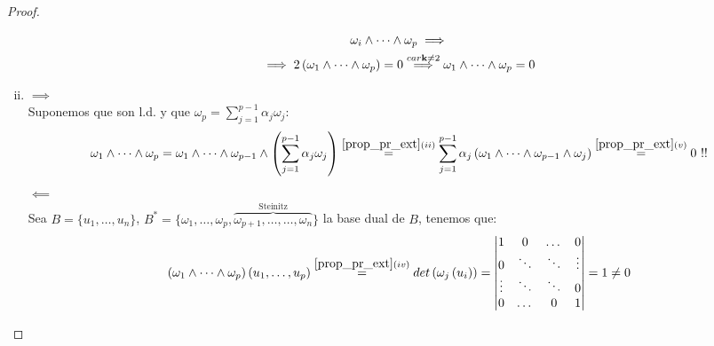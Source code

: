 \begin{proof}
\begin{enumerate}[i)]
\begin{gather*}
        \omega_i \wedge \dots \wedge \omega_p \implies \\
        \implies 2\left( \omega_1 \wedge \dots \wedge \omega_p \right) = 0
        \stackrel{car\mathbf{k} \neq 2}{\implies} \omega_1 \wedge \dots \wedge \omega_p = 0
        \end{gather*}
        \item $\implies$ \\
        Suponemos que son l.d. y que $\omega_p = \sum_{j=1}^{p-1} \alpha_j \omega_j$:
        \[
        \omega_1 \wedge \dots \wedge \omega_p = \omega_1 \wedge \dots \wedge \omega_{p-1} \wedge \left(
        \sum_{j=1}^{p-1} \alpha_j \omega_j \right) \stackrel{\ref{prop_pr_ext} (ii)}{=} \sum_{j=1}^{p-1}
        \alpha_j \left( \omega_1 \wedge \dots \wedge \omega_{p-1} \wedge \omega_j \right)
        \stackrel{\ref{prop_pr_ext} (v)}{=} 0 \text{ } !!
        \]
        $\impliedby$ \\
        Sea $B=\{u_1,\dots,u_n\}$, $B^*=\{\omega_1, \dots, \omega_p,\overbrace{\omega_{p+1},\dots, \dots,
		    \omega_n}^{\text{Steinitz}} \}$ la base dual de $B$, tenemos que:
        \[
        \left( \omega_1 \wedge \dots \wedge \omega_p \right) \left( u_1,\dots,u_p \right) \stackrel{\ref{prop_pr_ext} (iv)}{=}
        det\left( \omega_j \left(u_i \right) \right) = 
        \begin{vmatrix}
            1 & 0 & \dots & 0 \\
            0 & \ddots & \ddots & \vdots \\
            \vdots & \ddots & \ddots & 0 \\
            0 & \dots & 0 & 1
        \end{vmatrix}
        = 1 \neq 0
        \]
    \end{enumerate}
\end{proof}
